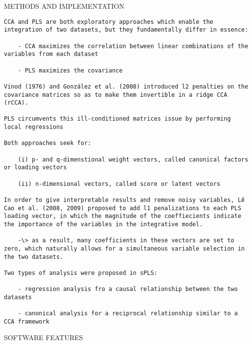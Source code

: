 \documentclass[
]{book}
\begin{document}
METHODS AND IMPLEMENTATION

\begin{verbatim}
CCA and PLS are both exploratory approaches which enable the integration of two datasets, but they fundamentally differ in essence:

    - CCA maximizes the correlation between linear combinations of the variables from each dataset

    - PLS maximizes the covariance

Vinod (1976) and González et al. (2008) introduced l2 penalties on the covariance matrices so as to make them invertible in a ridge CCA (rCCA).

PLS circumvents this ill-conditioned matrices issue by performing local regressions

Both approaches seek for:

    (i) p- and q-dimenstional weight vectors, called canonical factors or loading vectors

    (ii) n-dimensional vectors, called score or latent vectors

In order to give interpretable results and remove noisy variables, Lê Cao et al. (2008, 2009) proposed to add l1 penalizations to each PLS loading vector, in which the magnitude of the coeffiecients indicate the importance of the variables in the integrative model.

    -\> as a result, many coefficients in these vectors are set to zero, which naturally allows for a simultaneous variable selection in the two datasets.

Two types of analysis were proposed in sPLS:

    - regression analysis fro a causal relationship between the two datasets

    - canonical analysis for a reciprocal relationship similar to a CCA framework
\end{verbatim}

SOFTWARE FEATURES
\end{document}
